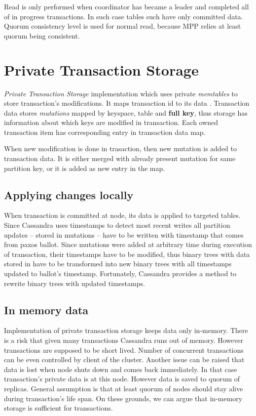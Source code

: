 Read is only performed when coordinator has became a leader and completed all of in progress transactions. In such case tables such have only committed data. Quorum consistency level is used for normal read, because MPP relies at least quorum being consistent.




\section{Private Transaction Storage}
\emph{Private Transaction Storage} implementation which uses private \emph{memtables} to store transaction's modifications. It maps transaction id to its data . Transaction data stores \emph{mutations} mapped by keyspace, table and \textbf{full key}, thus storage has information about which keys are modified in transaction. Each owned transaction item has corresponding entry in transaction data map.

When new modification is done in trasaction, then new mutation is added to transaction data. It is either merged with already present mutation for same partition key, or it is added as new entry in the map.


\subsection{Applying changes locally}
When transaction is committed at node, its data is applied to targeted tables.
Since Cassandra uses timestamps to detect most recent writes all partition updates -- stored in mutations -- have to be written with timestamp that comes from paxos ballot. Since mutations were added at arbitrary time during execution of transaction, their timestamps have to be modified, thus binary trees with data stored in  have to be transformed into new binary trees with all timestamps updated to ballot's timestamp. Fortunately, Cassandra provides a method to rewrite binary trees with updated timestamps.


\subsection{In memory data}
Implementation of private transaction storage keeps data only in-memory. There is a risk that given many transactions Cassandra runs out of memory. However transactions are supposed to be short lived. Number of concurrent transactions can be even controlled by client of the cluster. 
Another issue can be raised that data is lost when node shuts down and comes back immediately. In that case transaction’s private data is at this node. However data is saved to quorum of replicas. General assumption is that at least quorum of nodes should stay alive during transaction’s life span. On these grounds, we can argue that in-memory storage is sufficient for transactions.



